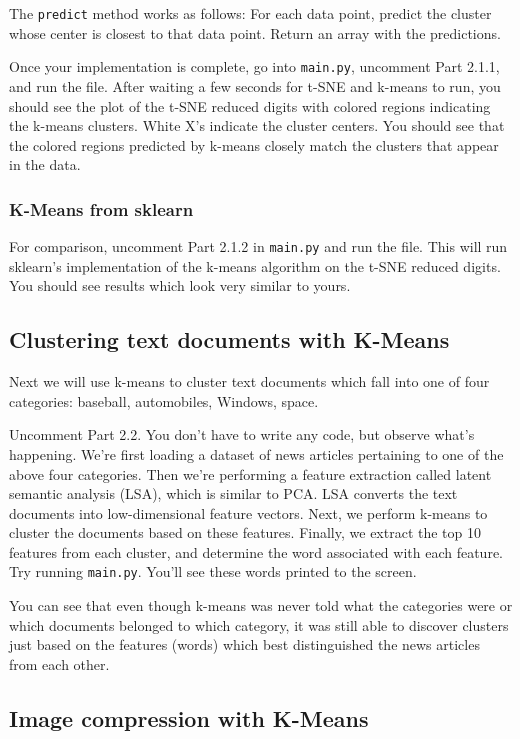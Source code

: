\documentclass{article}
\begin{document}
The \texttt{predict} method works as follows: For each data point, predict the cluster whose center is closest to that data point. Return an array with the predictions.

Once your implementation is complete, go into \texttt{main.py}, uncomment Part 2.1.1, and run the file. After waiting a few seconds for t-SNE and k-means to run, you should see the plot of the t-SNE reduced digits with colored regions indicating the k-means clusters. White X's indicate the cluster centers. You should see that the colored regions predicted by k-means closely match the clusters that appear in the data.

\subsubsection{K-Means from sklearn}

For comparison, uncomment Part 2.1.2 in \texttt{main.py} and run the file. This will run sklearn's implementation of the k-means algorithm on the t-SNE reduced digits. You should see results which look very similar to yours.

\subsection{Clustering text documents with K-Means}

Next we will use k-means to cluster text documents which fall into one of four categories: baseball, automobiles, Windows, space.

Uncomment Part 2.2. You don't have to write any code, but observe what's happening. We're first loading a dataset of news articles pertaining to one of the above four categories. Then we're performing a feature extraction called latent semantic analysis (LSA), which is similar to PCA. LSA converts the text documents into low-dimensional feature vectors. Next, we perform k-means to cluster the documents based on these features. Finally, we extract the top 10 features from each cluster, and determine the word associated with each feature. Try running \texttt{main.py}. You'll see these words printed to the screen.

You can see that even though k-means was never told what the categories were or which documents belonged to which category, it was still able to discover clusters just based on the features (words) which best distinguished the news articles from each other.

\subsection{Image compression with K-Means}
\end{document}
